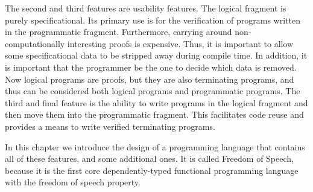 The second and third features are usability features.  The logical
fragment is purely specificational.  Its primary use is for the
verification of programs written in the programmatic fragment.
Furthermore, carrying around non-computationally interesting proofs is
expensive.  Thus, it is important to allow some specificational data
to be stripped away during compile time.  In addition, it is important
that the programmer be the one to decide which data is removed.  Now
logical programs are proofs, but they are also terminating programs,
and thus can be considered both logical programs and programmatic
programs.  The third and final feature is the ability to write
programs in the logical fragment and then move them into the
programmatic fragment.  This facilitates code reuse and provides a
means to write verified terminating programs.

In this chapter we introduce the design of a programming language that
contains all of these features, and some additional ones.  It is
called Freedom of Speech, because it is the first core
dependently-typed functional programming language with the freedom of
speech property.  

